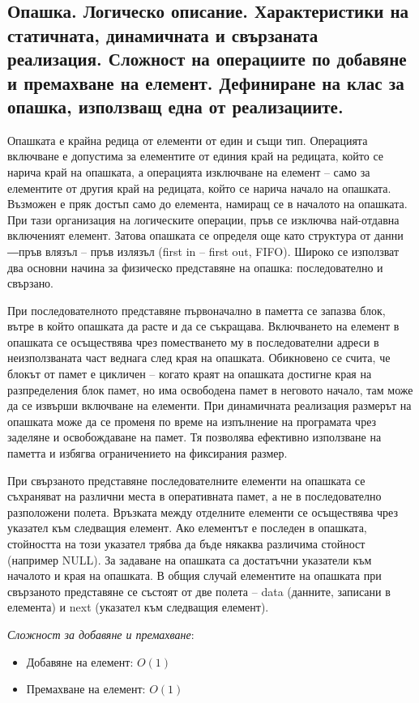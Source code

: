 \documentclass{article}
\renewcommand{\\}{\newline}
\begin{document}
\subsection{Опашка. Логическо описание. Характеристики на статичната, динамичната и свързаната реализация. Сложност на операциите по добавяне и премахване на елемент. Дефиниране на клас за опашка, използващ една от реализациите.}

Опашката е крайна редица от елементи от един и същи тип. Операцията включване е допустима за елементите от единия край на редицата, който се нарича край на опашката, а операцията изключване на елемент – само за елементите от другия край на редицата, който се нарича начало на опашката. Възможен е пряк достъп само до елемента, намиращ се в началото на опашката. При тази организация на логическите операции, пръв се изключва най-отдавна включеният елемент. Затова опашката се определя още като структура от данни ―пръв влязъл – пръв излязъл (first in – first out, FIFO). Широко се използват два основни начина за физическо представяне на опашка: последователно и свързано.

При последователното представяне първоначално в паметта се запазва блок, вътре в който опашката да расте и да се съкращава. Включването на елемент в опашката се осъществява чрез поместването му в последователни адреси в неизползваната част веднага след края на опашката. Обикновено се счита, че блокът от памет е цикличен – когато краят на опашката достигне края на разпределения блок памет, но има освободена памет в неговото начало, там може да се извърши включване на елементи. При динамичната реализация размерът на опашката може да се променя по време на изпълнение на програмата чрез заделяне и освобождаване на памет. Тя позволява ефективно използване на паметта и избягва ограничението на фиксирания размер.

При свързаното представяне последователните елементи на опашката се съхраняват на различни места в оперативната памет, а не в последователно разположени полета. Връзката между отделните елементи се осъществява чрез указател към следващия елемент. Ако елементът е последен в опашката, стойността на този указател трябва да бъде някаква различима стойност (например NULL). За задаване на опашката са достатъчни указатели към началото и края на опашката. В общия случай елементите на опашката при свързаното представяне се състоят от две полета – data (данните, записани в елемента) и next (указател към следващия елемент).

\textit{Сложност за добавяне и премахване}:
\begin{itemize}
    \item Добавяне на елемент: \(O(1)\) 
    \item Премахване на елемент: \(O(1)\) 
\end{itemize}
\end{document}
